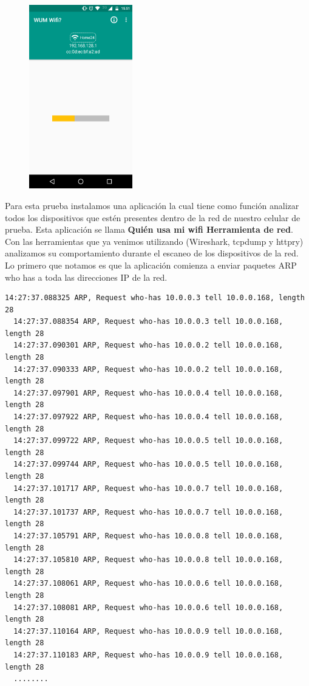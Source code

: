 \begin{figure}
    \centering
    \includegraphics[width=4.5cm]{img/miwifi.png}
\end{figure}

Para esta prueba instalamos una aplicación la cual tiene como función analizar todos los dispositivos que estén presentes dentro de la 
red de nuestro celular de prueba. Esta aplicación se llama \textbf{Quién usa mi wifi Herramienta de red}. Con las herramientas que ya venimos 
utilizando (Wireshark, tcpdump y httpry) analizamos su comportamiento durante el escaneo de los dispositivos de la red. Lo primero que 
notamos es que la aplicación comienza a enviar paquetes ARP who has a toda las direcciones IP de la red. 

\begin{lstlisting}[style=base,basicstyle=\small\color{white}]
  14:27:37.088325 ARP, Request who-has 10.0.0.3 tell 10.0.0.168, length 28
  14:27:37.088354 ARP, Request who-has 10.0.0.3 tell 10.0.0.168, length 28
  14:27:37.090301 ARP, Request who-has 10.0.0.2 tell 10.0.0.168, length 28
  14:27:37.090333 ARP, Request who-has 10.0.0.2 tell 10.0.0.168, length 28
  14:27:37.097901 ARP, Request who-has 10.0.0.4 tell 10.0.0.168, length 28
  14:27:37.097922 ARP, Request who-has 10.0.0.4 tell 10.0.0.168, length 28
  14:27:37.099722 ARP, Request who-has 10.0.0.5 tell 10.0.0.168, length 28
  14:27:37.099744 ARP, Request who-has 10.0.0.5 tell 10.0.0.168, length 28
  14:27:37.101717 ARP, Request who-has 10.0.0.7 tell 10.0.0.168, length 28
  14:27:37.101737 ARP, Request who-has 10.0.0.7 tell 10.0.0.168, length 28
  14:27:37.105791 ARP, Request who-has 10.0.0.8 tell 10.0.0.168, length 28
  14:27:37.105810 ARP, Request who-has 10.0.0.8 tell 10.0.0.168, length 28
  14:27:37.108061 ARP, Request who-has 10.0.0.6 tell 10.0.0.168, length 28
  14:27:37.108081 ARP, Request who-has 10.0.0.6 tell 10.0.0.168, length 28
  14:27:37.110164 ARP, Request who-has 10.0.0.9 tell 10.0.0.168, length 28
  14:27:37.110183 ARP, Request who-has 10.0.0.9 tell 10.0.0.168, length 28
  ........
\end{lstlisting}

